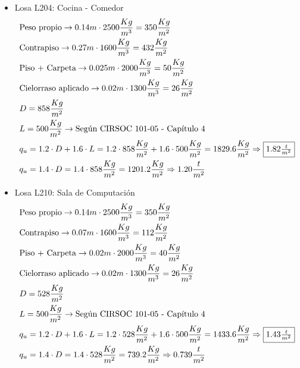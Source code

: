 \begin{enumerate}
\begin{itemize}
\item Losa L204: Cocina - Comedor
\begin{align*}
& \text{Peso propio} \rightarrow 0.14m \cdot 2500 \frac{Kg}{m^3} = 350 \frac{Kg}{m^2}\\
& \text{Contrapiso} \rightarrow 0.27m \cdot 1600 \frac{Kg}{m^3} = 432 \frac{Kg}{m^2}\\
& \text{Piso + Carpeta} \rightarrow 0.025m \cdot 2000 \frac{Kg}{m^3} = 50 \frac{Kg}{m^2}\\
& \text{Cielorraso aplicado} \rightarrow  0.02m \cdot 1300 \frac{Kg}{m^3} = 26 \frac{Kg}{m^2}\\
& D = 858 \frac{Kg}{m^2}\\
& L = 500 \frac{Kg}{m^2} \rightarrow \text{Según CIRSOC 101-05 - Capítulo 4}\\
& q_u = 1.2 \cdot D + 1.6 \cdot L = 1.2 \cdot 858 \frac{Kg}{m^2} + 1.6 \cdot 500 \frac{Kg}{m^2} = 1829.6 \frac{Kg}{m^2} \Rightarrow \framebox{$1.82 \frac{t}{m^2}$}\\
& q_u = 1.4 \cdot D = 1.4 \cdot 858 \frac{Kg}{m^2} = 1201.2 \frac{Kg}{m^2} \Rightarrow 1.20 \frac{t}{m^2}
\end{align*}

\item Losa L210: Sala de Computación
\begin{align*}
& \text{Peso propio} \rightarrow 0.14m \cdot 2500 \frac{Kg}{m^3} = 350 \frac{Kg}{m^2}\\
& \text{Contrapiso} \rightarrow 0.07m \cdot 1600 \frac{Kg}{m^3} = 112 \frac{Kg}{m^2}\\
& \text{Piso + Carpeta} \rightarrow 0.02m \cdot 2000 \frac{Kg}{m^3} = 40 \frac{Kg}{m^2}\\
& \text{Cielorraso aplicado} \rightarrow  0.02m \cdot 1300 \frac{Kg}{m^3} = 26 \frac{Kg}{m^2}\\
& D = 528 \frac{Kg}{m^2}\\
& L = 500 \frac{Kg}{m^2} \rightarrow \text{Según CIRSOC 101-05 - Capítulo 4}\\
& q_u = 1.2 \cdot D + 1.6 \cdot L = 1.2 \cdot 528 \frac{Kg}{m^2} + 1.6 \cdot 500 \frac{Kg}{m^2} = 1433.6 \frac{Kg}{m^2} \Rightarrow \framebox{$1.43 \frac{t}{m^2}$} \\
& q_u = 1.4 \cdot D = 1.4 \cdot 528 \frac{Kg}{m^2} = 739.2 \frac{Kg}{m^2} \Rightarrow 0.739 \frac{t}{m^2}
\end{align*}


\end{itemize}
\end{enumerate}
